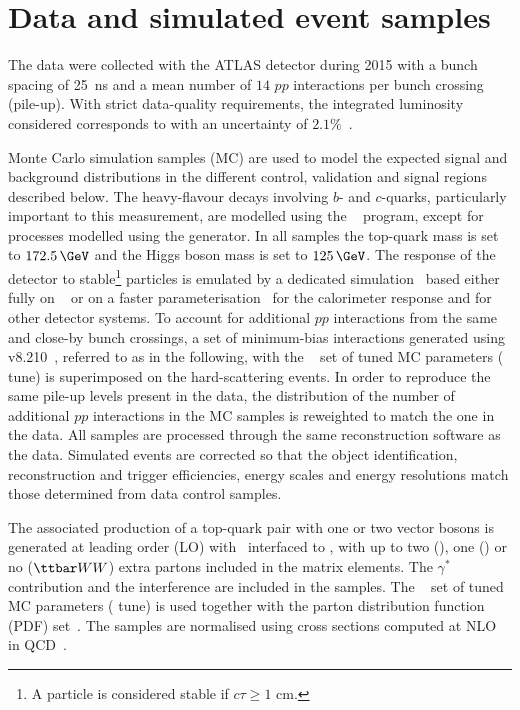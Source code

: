 \section{Data and simulated event samples}
\label{s:samples}

The data were collected with the ATLAS detector during 2015 with a 
bunch spacing of \SI{25}{ns} and a mean number of $14$ $pp$ 
interactions per bunch crossing (pile-up).
With strict data-quality requirements, the integrated luminosity considered
corresponds to \lumi with an uncertainty of $2.1\%$~\cite{Aaboud:2016hhf}. 

Monte Carlo simulation samples (MC) are used to model the expected signal and
background distributions in the different control, validation and signal regions
described below. The
heavy-flavour decays involving $b$- and $c$-quarks, 
particularly important to this measurement, are modelled
using the \EVTGEN~\cite{EvtGen} program, except for processes modelled using the
\SHERPA generator. In all samples the top-quark mass is set to $172.5\,\GeV$ and
the Higgs boson mass is set to $125\,\GeV$. The response of the detector to
stable\footnote{A particle is considered stable if $c\tau \ge 1$ cm.} particles
is emulated by a dedicated simulation~\cite{SOFT-2010-01} based either fully on
\GEANT~\cite{geant} or on a faster parameterisation~\cite{ATL-PHYS-PUB-2010-013}
for the calorimeter response and \GEANT for other detector systems. To account for
additional $pp$ interactions from the same and close-by bunch crossings, a set
of minimum-bias interactions generated using \PYTHIA v8.210~\cite{Sjostrand:2014zea}, 
referred to as  in the following, 
with the ~\cite{ATL-PHYS-PUB-2011-014} set of tuned MC parameters ( tune)
is superimposed on the
hard-scattering events.  In order to reproduce the same pile-up levels present in
the data, the distribution of the number of additional $pp$ interactions in the
MC samples is reweighted to match the one in the data. All samples are processed
through the same reconstruction software as the data. Simulated events are
corrected so that the object identification, reconstruction and trigger
efficiencies, energy scales and energy resolutions match those determined from
data control samples.

The associated production of a top-quark pair with one or two vector bosons is
generated at leading order (LO) with \MGAMC\ interfaced to , with up to
two (\ttW), one (\ttZ) or no ($\bgttWW$) extra partons included in the matrix
elements. The $\gamma^{*}$ contribution and the \Zgamstar interference are 
included in the \ttZ samples. 
The  ~\cite{ATL-PHYS-PUB-2014-021} set of tuned MC parameters ( tune) is used together with the 
 parton distribution function (PDF) set~\cite{Ball:2012cx}.
The samples are normalised using cross sections computed at
NLO in QCD~\cite{ATL-PHYS-PUB-2016-005}.

